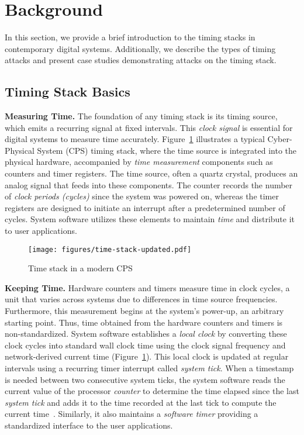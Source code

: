 \section{Background} \label{background}
In this section, we provide a brief introduction to the timing stacks in contemporary digital systems. Additionally, we describe the types of timing attacks and present case studies demonstrating attacks on the timing stack.

\subsection{Timing Stack Basics}\label{subsec:local-clocks}
\noindent\textbf{Measuring Time.}
The foundation of any timing stack is its timing source, which emits a recurring signal at fixed intervals. This \textit{clock signal} is essential for digital systems to measure time accurately. Figure~\ref{fig:time-stack-example} illustrates a typical Cyber-Physical System (CPS) timing stack, where the time source is integrated into the physical hardware, accompanied by \textit{time measurement} components such as counters and timer registers. The time source, often a quartz crystal, produces an analog signal that feeds into these components. The counter records the number of \textit{clock periods (cycles)} since the system was powered on, whereas the timer registers are designed to initiate an interrupt after a predetermined number of cycles. System software utilizes these elements to maintain \textit{time} and distribute it to user applications.
\begin{figure}[h]
        \centering           
        \texttt{[image: figures/time-stack-updated.pdf]}
        \caption{Time stack in a modern CPS}
        \label{fig:time-stack-example}
\end{figure}

\noindent\textbf{Keeping Time.} Hardware counters and timers measure time in clock cycles, a unit that varies across systems due to differences in time source frequencies. Furthermore, this measurement begins at the system's power-up, an arbitrary starting point. Thus, time obtained from the hardware counters and timers is non-standardized. System software establishes a \textit{local clock} by converting these clock cycles into standard wall clock time using the clock signal frequency and network-derived current time (Figure~\ref{fig:time-stack-example}). This local clock is updated at regular intervals using a recurring timer interrupt called \textit{system tick}. When a timestamp is needed between two consecutive system ticks, the system software reads the current value of the processor \textit{counter} to determine the time elapsed since the last \textit{system tick} and adds it to the time recorded at the last tick to compute the current time~\cite{linux-hrtimers}. Similarly, it also maintains a \textit{software timer} providing a standardized interface to the user applications.

